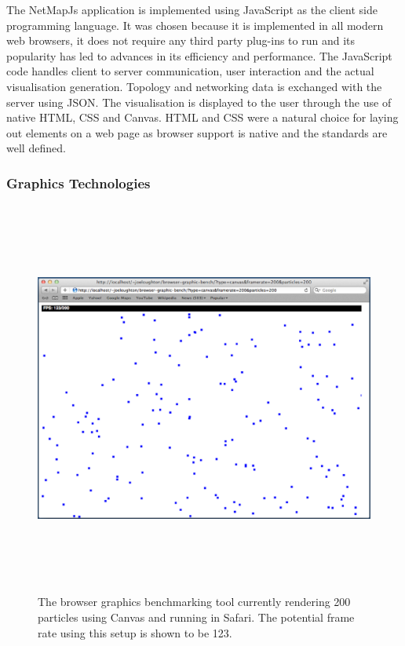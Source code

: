 \documentclass[11pt, a4paper]{article}
\begin{document}
The NetMapJs application is implemented using JavaScript as the client side
programming language. It was chosen because it is implemented in all modern web
browsers, it does not require any third party plug-ins to run and its popularity
has led to advances in its efficiency and performance. The JavaScript code
handles client to server communication, user interaction and the actual
visualisation generation. Topology and networking data is exchanged with the
server using JSON. The visualisation is displayed to the user through the use of
native HTML, CSS and Canvas. HTML and CSS were a natural choice for laying out
elements on a web page as browser support is native and the standards are well
defined.


\subsubsection{Graphics Technologies}

\begin{figure}
\centering
\includegraphics[width=170mm,height=130.08mm]{assets/benchmark-tool.eps}
\caption{The browser graphics benchmarking tool currently rendering 200
particles using Canvas and running in Safari. The potential frame rate using
this setup is shown to be 123.}
\label{fig:benchmark-tool}
\end{figure}
\end{document}
